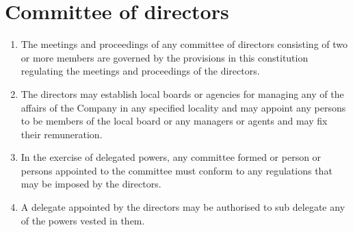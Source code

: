 \section{Committee of directors}

\begin{enumerate}[label=(\alph*)]
    \item The meetings and proceedings of any committee of directors consisting of two or more members are governed by the provisions in this constitution regulating the meetings and proceedings of the directors.
    
    \item The directors may establish local boards or agencies for managing any of the affairs of the Company in any specified locality and may appoint any persons to be members of the local board or any managers or agents and may fix their remuneration.
    
    \item In the exercise of delegated powers, any committee formed or person or persons appointed to the committee must conform to any regulations that may be imposed by the directors.
    
    \item A delegate appointed by the directors may be authorised to sub delegate any of the powers vested in them.
\end{enumerate} 
